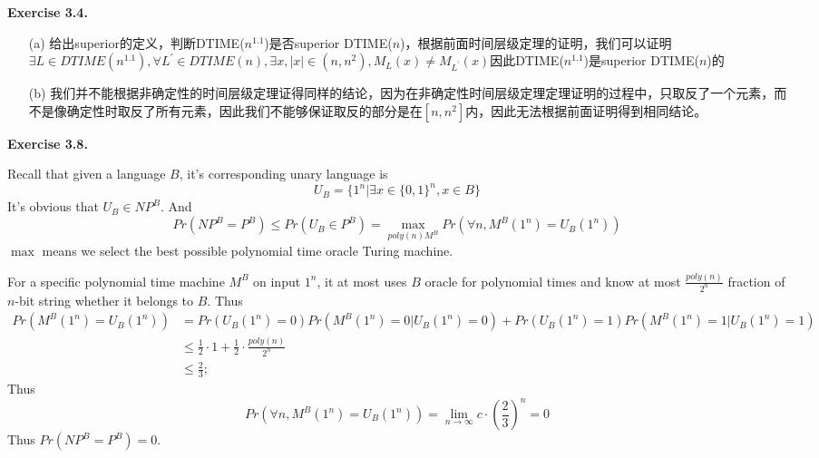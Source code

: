 \documentclass[a4paper]{article}
\newenvironment{exercise}[1]{
	\par
	\noindent\textbf{Exercise #1.}\quad
}{
	\par
	\bigskip
}
\begin{document}
\begin{exercise}{3.4}
    \begin{itemize}
        \item [(a)] 给出superior的定义，判断DTIME($n^{1.1}$)是否superior DTIME($n$)，根据前面时间层级定理的证明，我们可以证明$\exists L\in DTIME(n^{1.1}), \forall L^{'}\in DTIME(n),\exists x,|x|\in(n,n^2),M_L(x)\ne M_{L^{'}}(x)$因此DTIME($n^{1.1}$)是superior DTIME($n$)的
        \item [(b)] 我们并不能根据非确定性的时间层级定理证得同样的结论，因为在非确定性时间层级定理定理证明的过程中，只取反了一个元素，而不是像确定性时取反了所有元素，因此我们不能够保证取反的部分是在$[n,n^2]$内，因此无法根据前面证明得到相同结论。
    \end{itemize}
\end{exercise}

\begin{exercise}{3.8}
    Recall that given a language $B$, it's corresponding unary language is
    $$
    U_B=\{1^n| \exists x\in \{0,1\}^n, x\in B \}
    $$
   It's obvious that $U_B\in NP^B$. And
$$
Pr(NP^B=P^B)\leq Pr(U_B\in P^B)= \max_{poly(n) M^B} Pr(\forall n, M^B(1^n)=U_B(1^n))
$$
 $\max$ means we select the best possible polynomial time oracle Turing machine.

For a specific polynomial time machine $M^B$ on input $1^n$, it at most uses $B$ oracle for polynomial times and know at most $\frac{poly(n)}{2^n}$ fraction of $n$-bit string whether it belongs to $B$. Thus
\begin{align*}
Pr(M^B(1^n)=U_B(1^n))&=Pr(U_B(1^n)=0)Pr(M^B(1^n)=0|U_B(1^n)=0)+Pr(U_B(1^n)=1)Pr(M^B(1^n)=1|U_B(1^n)=1)\\
&\leq\frac{1}{2}\cdot 1+\frac{1}{2}\cdot \frac{poly(n)}{2^n}\\
&\leq\frac{2}{3};
\end{align*}
Thus
$$
 Pr(\forall n, M^B(1^n)=U_B(1^n))=\lim_{n\rightarrow \infty} c\cdot(\frac{2}{3})^n=0
$$
 Thus $Pr(NP^B=P^B)=0$.

 

\end{exercise}
\end{document}
